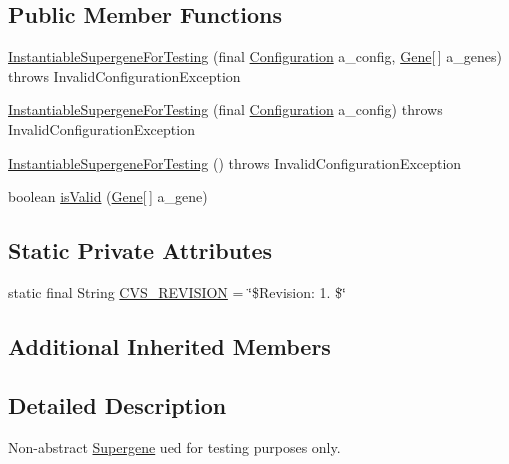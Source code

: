 \subsection*{Public Member Functions}
\begin{DoxyCompactItemize}
\item 
\hyperlink{classorg_1_1jgap_1_1supergenes_1_1_instantiable_supergene_for_testing_a670e187aed369d38559d2a2589a2d4f0}{Instantiable\-Supergene\-For\-Testing} (final \hyperlink{classorg_1_1jgap_1_1_configuration}{Configuration} a\-\_\-config, \hyperlink{interfaceorg_1_1jgap_1_1_gene}{Gene}\mbox{[}$\,$\mbox{]} a\-\_\-genes)  throws Invalid\-Configuration\-Exception 
\item 
\hyperlink{classorg_1_1jgap_1_1supergenes_1_1_instantiable_supergene_for_testing_a25f40fc7b3aa89aeacef7cc3816109e4}{Instantiable\-Supergene\-For\-Testing} (final \hyperlink{classorg_1_1jgap_1_1_configuration}{Configuration} a\-\_\-config)  throws Invalid\-Configuration\-Exception 
\item 
\hyperlink{classorg_1_1jgap_1_1supergenes_1_1_instantiable_supergene_for_testing_a00fb404f801e41bbce77c0db54da1992}{Instantiable\-Supergene\-For\-Testing} ()  throws Invalid\-Configuration\-Exception 
\item 
boolean \hyperlink{classorg_1_1jgap_1_1supergenes_1_1_instantiable_supergene_for_testing_a868ded61d1a531a65d3c5efdfeb9edce}{is\-Valid} (\hyperlink{interfaceorg_1_1jgap_1_1_gene}{Gene}\mbox{[}$\,$\mbox{]} a\-\_\-gene)
\end{DoxyCompactItemize}
\subsection*{Static Private Attributes}
\begin{DoxyCompactItemize}
\item 
static final String \hyperlink{classorg_1_1jgap_1_1supergenes_1_1_instantiable_supergene_for_testing_a8d28bf276ecc906fceb27015729f5df9}{C\-V\-S\-\_\-\-R\-E\-V\-I\-S\-I\-O\-N} = \char`\"{}\$Revision\-: 1. \$\char`\"{}
\end{DoxyCompactItemize}
\subsection*{Additional Inherited Members}


\subsection{Detailed Description}
Non-\/abstract \hyperlink{interfaceorg_1_1jgap_1_1supergenes_1_1_supergene}{Supergene} ued for testing purposes only.

